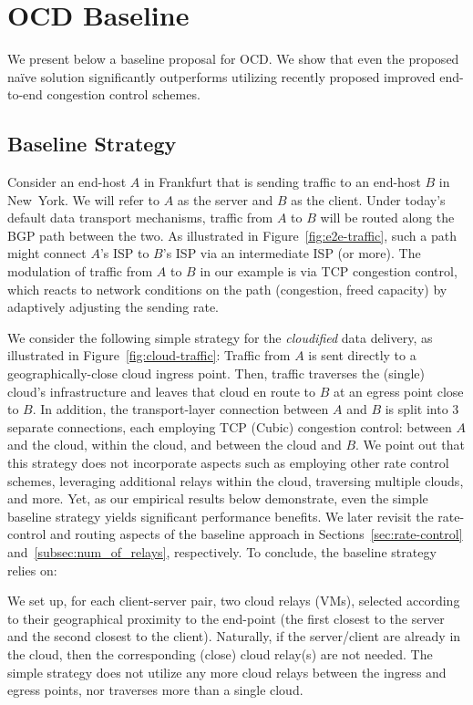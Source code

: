 \documentclass[newfonts=false,format=sigconf,anonymous,10pt,letterpaper]{acmart}
\begin{document}
\section{OCD Baseline
}\label{sec:ocd-baseline}

We present below a baseline proposal for OCD. We show that even the proposed na\"ive solution significantly outperforms utilizing recently proposed improved end-to-end congestion control schemes.

\subsection{Baseline Strategy}

Consider an end-host $A$ in Frankfurt that is sending traffic to an end-host $B$ in New~York. We will refer to $A$ as the server and $B$ as the client. Under today's default data transport mechanisms, traffic from $A$ to $B$ will be routed along the BGP path between the two. As illustrated in Figure~\ref{fig:e2e-traffic}, such a path might connect $A$'s ISP to $B$'s ISP via an intermediate ISP (or more). The modulation of traffic from $A$ to $B$ in our example is via TCP congestion control, which reacts to network conditions on the path (congestion, freed capacity) by adaptively adjusting the sending rate.        

We consider the following simple strategy for the \textit{cloudified} data delivery,
as illustrated in Figure~\ref{fig:cloud-traffic}: Traffic from $A$ is sent
directly to a geographically-close cloud ingress point. Then, traffic traverses the (single) cloud's infrastructure and leaves that cloud en
route to $B$ at an egress point close to $B$. In addition, the
transport-layer connection between $A$ and $B$ is split into $3$ separate connections, each employing TCP (Cubic) congestion
control: between $A$ and the cloud, within the cloud, and between the cloud and
$B$. We point out that this strategy does not incorporate aspects
such as employing other rate control schemes, leveraging additional relays
within the cloud, traversing multiple clouds, and more. Yet, as our empirical
results below demonstrate, even the simple baseline strategy yields significant
performance benefits. We later revisit the rate-control and routing aspects of the baseline approach in Sections~\ref{sec:rate-control} and~\ref{subsec:num_of_relays}, respectively.
To conclude, the baseline strategy relies on:

\vspace{0.1in} We set up, for each client-server pair, two cloud relays (VMs), selected according to their geographical proximity to the end-point (the first closest to the server and the second closest to the client). Naturally, if the server/client are already in the cloud, then the corresponding (close) cloud relay(s) are not needed. The simple strategy does not utilize any more cloud relays between the ingress and egress points, nor traverses more than a single cloud.
\end{document}
